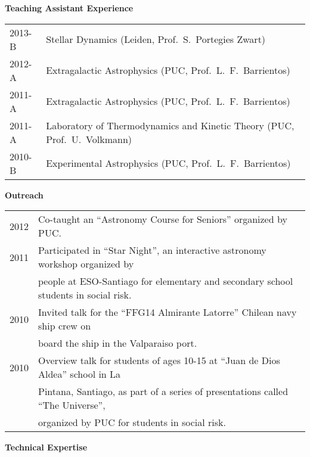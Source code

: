 \documentclass[11pt]{article}
\begin{document}
\pagebreak

\noindent
{\bf\Large Teaching Assistant Experience}\\
\vspace{-0.2cm}

\begin{table}[h!]
\begin{tabular}{l l}
2013-B & Stellar Dynamics (Leiden, Prof.~S.~Portegies Zwart)\\
2012-A & Extragalactic Astrophysics (PUC, Prof.~L.~F.~Barrientos)\\
2011-A & Extragalactic Astrophysics (PUC, Prof.~L.~F.~Barrientos)\\
2011-A & Laboratory of Thermodynamics and Kinetic Theory (PUC, Prof.~U.~Volkmann)\\
2010-B & Experimental Astrophysics (PUC, Prof.~L.~F.~Barrientos)
\end{tabular}
\end{table}


\noindent
{\bf\Large Outreach}\\
\vspace{-0.2cm}

\begin{table}[h!]
\begin{tabular}{l l}
2012 & Co-taught an ``Astronomy Course for Seniors'' organized by PUC.\\
2011 & Participated in ``Star Night'', an interactive astronomy workshop organized by\\
     & people at ESO-Santiago for elementary and secondary school students in social risk.\\
2010  & Invited talk for the ``FFG14 Almirante Latorre'' Chilean navy ship crew on\\
      & board the ship in the Valparaiso port.\\
2010  & Overview talk for students of ages 10-15 at ``Juan de Dios Aldea'' school in La\\
      & Pintana, Santiago, as part of a series of presentations called ``The Universe'',\\
      & organized by PUC for students in social risk.\\
\end{tabular}
\end{table}


\noindent
{\bf\Large Technical Expertise}\\
\end{document}

